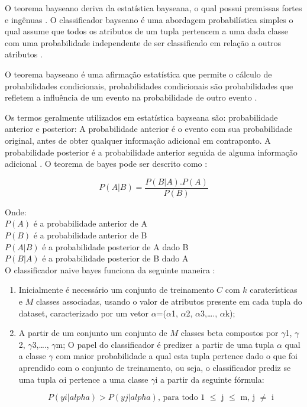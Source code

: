 \documentclass[
	12pt,				%
	oneside,			%
	a4paper,			%
	english,			%
	brazil				%
	]{abntex2ppgsi}
\begin{document}
O teorema bayseano deriva da estatística bayseana, o qual possui premissas fortes e ingênuas \cite{Suresh2016}. O classificador bayseano é uma abordagem probabilística simples o qual assume que todos os atributos de um tupla pertencem a uma dada classe com uma probabilidade independente de ser classificado em relação a outros atributos  \cite{Suresh2016}.
 
O teorema bayseano é uma afirmação estatística que permite o cálculo de probabilidades condicionais, probabilidades condicionais são probabilidades que refletem a influência de um evento na probabilidade de outro evento  \cite{ sharma2015} .

Os termos geralmente utilizados em estatística bayseana são: probabilidade anterior e posterior: A probabilidade anterior é o evento com sua probabilidade original, antes de obter qualquer informação adicional em contraponto. A probabilidade posterior é a probabilidade anterior seguida de alguma informação adicional  \cite{ sharma2015}. O teorema de bayes pode ser descrito como  \cite{ sharma2015}:

\begin{equation}
P(A|B) = \frac{P(B|A).P(A)}{P(B)}
\end{equation}

Onde:\\
$P(A)$ é a probabilidade anterior de A\\
$P(B)$ é a probabilidade anterior de B\\
$P(A|B)$ é a probabilidade posterior de A dado B\\
$P(B|A)$ é a probabilidade posterior de B dado A\\

O classificador naive bayes funciona da seguinte maneira \cite{ Seth2016}:

\begin{enumerate}
  \item Inicialmente é necessário um conjunto de treinamento $C$ com $k$ caraterísticas e  $M$ classes associadas, usando o valor de atributos presente em cada tupla do dataset, caracterizado por um vetor $\alpha$=($\alpha$1, $\alpha$2, $\alpha$3,…., $\alpha$k);
  \item A partir de um conjunto um conjunto de $M$ classes beta compostos por $\gamma$1, $\gamma$2, $\gamma$3,…., $\gamma$m; O papel do classificador é predizer a partir de uma tupla $\alpha$ qual a classe  $\gamma$ com maior probabilidade a qual esta tupla pertence dado o que foi aprendido com o conjunto de treinamento, ou seja, o classificador prediz se uma tupla $\alpha$i pertence a uma classe $\gamma$i a partir da seguinte fórmula:
  
\begin{equation}
P(yi|alpha) > P(yj|alpha)\textrm{, para todo 1 $\leq$ j $\leq$ m, j $\neq$ i}
\end{equation}

\end{enumerate}
\end{document}

